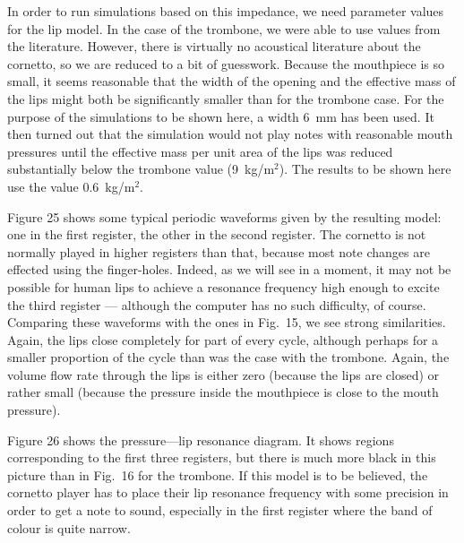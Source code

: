   In order to run simulations based on this impedance, we need parameter values 
  for the lip model. In the case of the trombone, we were able to use values 
  from the literature. However, there is virtually no acoustical literature 
  about the cornetto, so we are reduced to a bit of guesswork. Because the 
  mouthpiece is so small, it seems reasonable that the width of the opening and 
  the effective mass of the lips might both be significantly smaller than for 
  the trombone case. For the purpose of the simulations to be shown here, a 
  width 6~mm has been used. It then turned out that the simulation would not 
  play notes with reasonable mouth pressures until the effective mass per unit 
  area of the lips was reduced substantially below the trombone value 
  (9~kg/m$^2$). The results to be shown here use the value 0.6~kg/m$^2$. 

  Figure 25 shows some typical periodic waveforms given by the resulting model: 
  one in the first register, the other in the second register. The cornetto is 
  not normally played in higher registers than that, because most note changes 
  are effected using the finger-holes. Indeed, as we will see in a moment, it 
  may not be possible for human lips to achieve a resonance frequency high 
  enough to excite the third register — although the computer has no such 
  difficulty, of course. Comparing these waveforms with the ones in Fig.\ 15, 
  we see strong similarities. Again, the lips close completely for part of 
  every cycle, although perhaps for a smaller proportion of the cycle than was 
  the case with the trombone. Again, the volume flow rate through the lips is 
  either zero (because the lips are closed) or rather small (because the 
  pressure inside the mouthpiece is close to the mouth pressure). 

  Figure 26 shows the pressure—lip resonance diagram. It shows regions 
  corresponding to the first three registers, but there is much more black in 
  this picture than in Fig.\ 16 for the trombone. If this model is to be 
  believed, the cornetto player has to place their lip resonance frequency with 
  some precision in order to get a note to sound, especially in the first 
  register where the band of colour is quite narrow. 


